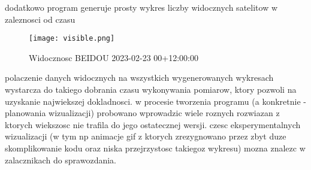 \documentclass[twocolumn]{article}
\begin{document}
\newline dodatkowo program generuje prosty wykres liczby widocznych satelitow w zaleznosci od czasu
\begin{figure}[h]
\caption{Widocznosc BEIDOU 2023-02-23 00+12:00:00}
\texttt{[image: visible.png]}
\centering
\end{figure}
\newline polaczenie danych widocznych na wszystkich wygenerowanych wykresach wystarcza do takiego dobrania czasu wykonywania pomiarow, ktory pozwoli na uzyskanie najwiekszej dokladnosci. w procesie tworzenia programu (a konkretnie - planowania wizualizacji) probowano wprowadzic wiele roznych rozwiazan z ktorych wiekszosc nie trafila do jego ostatecznej wersji. czesc eksperymentalnych wizualizacji (w tym np animacje gif z ktorych zrezygnowano przez zbyt duze skomplikowanie kodu oraz niska przejrzystosc takiegoz wykresu) mozna znalezc w zalacznikach do sprawozdania.
\end{document}
